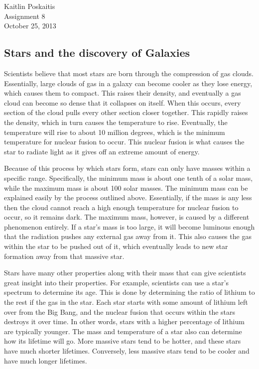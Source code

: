 \documentclass[12pt]{article}
\begin{document}
\noindent Kaitlin Poskaitis\\
Assignment 8\\
October 25, 2013
\begin{center}
    \section*{\bf Stars and the discovery of Galaxies}
\end{center}


Scientists believe that most stars are born through the compression of gas
clouds.  Essentially, large clouds of gas in a galaxy can become cooler as they
lose energy, which causes them to compact.  This raises their density, and
eventually a gas cloud can become so dense that it collapses on itself.  When
this occurs, every section of the cloud pulls every other section closer
together.  This rapidly raises the density, which in turn causes the temperature
to rise.  Eventually, the temperature will rise to about 10 million degrees,
which is the minimum temperature for nuclear fusion to occur.  This nuclear
fusion is what causes the star to radiate light as it gives off an extreme
amount of energy.

Because of this process by which stars form, stars can only have masses within a
specific range.  Specifically, the minimum mass is about one tenth of a solar
mass, while the maximum mass is about 100 solar masses.  The minimum mass can be
explained easily by the process outlined above.  Essentially, if the mass is any
less then the cloud cannot reach a high enough temperature for nuclear fusion to
occur, so it remains dark.  The maximum mass, however, is caused by a different
phenomenon entirely.  If a star's mass is too large, it will become luminous
enough that the radiation pushes any external gas away from it.  This also
causes the gas within the star to be pushed out of it, which eventually leads to
new star formation away from that massive star.

Stars have many other properties along with their mass that can give scientists
great insight into their properties.  For example, scientists can use a star's
spectrum to determine its age.  This is done by determining the ratio of lithium
to the rest if the gas in the star.  Each star starts with some amount of
lithium left over from the Big Bang, and the nuclear fusion that occurs within
the stars destroys it over time.  In other words, stars with a higher percentage
of lithium are typically younger.  The mass and temperature of a star also can
determine how its lifetime will go.  More massive stars tend to be hotter, and
these stars have much shorter lifetimes.  Conversely, less massive stars tend to
be cooler and have much longer lifetimes.
\end{document}
